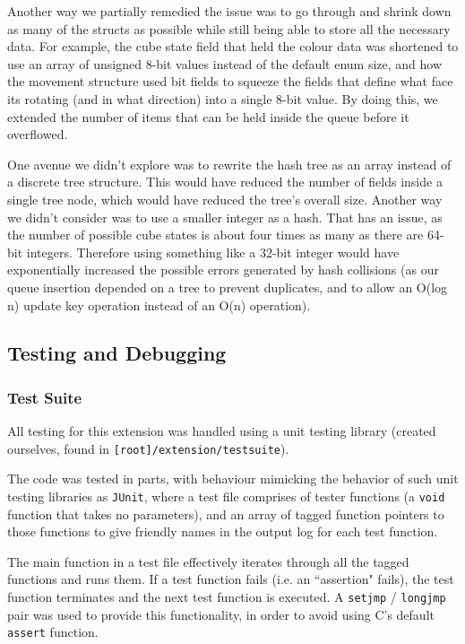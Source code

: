 \documentclass[8pt]{article}
\begin{document}
Another way we partially remedied the issue was to go through and shrink down as many of the structs as possible
while still being able to store all the necessary data.
For example, the cube state field that held the colour data was shortened to use an array of unsigned
8-bit values instead of the default enum size, and how the movement structure used bit fields to squeeze
the fields that define what face its rotating (and in what direction) into a single 8-bit value.
By doing this, we extended the number of items that can be held inside the queue before it overflowed.

One avenue we didn't explore was to rewrite the hash tree as an array instead of a discrete tree structure.
This would have reduced the number of fields inside a single tree node, which would have reduced the tree's overall size.
Another way we didn't consider was to use a smaller integer as a hash. That has an issue, as the number of possible cube states
is about four times as many as there are 64-bit integers. Therefore using something like a 32-bit integer would have exponentially
increased the possible errors generated by hash collisions (as our queue insertion depended on a tree to prevent duplicates, and to
allow an O(log n) update key operation instead of an O(n) operation).

\subsection{Testing and Debugging}

\subsubsection{Test Suite}

All testing for this extension was handled using a unit testing library (created ourselves, found in \texttt{[root]/extension/testsuite}).

The code was tested in parts, with behaviour mimicking the behavior of such unit testing libraries as \texttt{JUnit}, where a test file comprises of tester functions (a \texttt{void} function that takes no parameters), and an array of tagged function pointers to those functions to give friendly names in the output log for each test function.

The main function in a test file effectively iterates through all the tagged functions and runs them.
If a test function fails (i.e. an ``assertion" fails), the test function terminates and the next test function is executed.
A \texttt{setjmp} / \texttt{longjmp} pair was used to provide this functionality, in order to avoid using C's default \texttt{assert} function.
\end{document}
